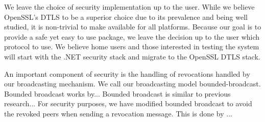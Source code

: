 \documentclass[conference]{IEEEtran}
\begin{document}


We leave the choice of security implementation up to the user.  While we believe
OpenSSL's DTLS to be a superior choice due to its prevalence and being well
studied, it is non-trivial to make available for all platforms.  Because our
goal is to provide a safe yet easy to use package, we leave the decision up to
the user which protocol to use.  We believe home users and those interested in
testing the system will start with the .NET security stack and migrate to the
OpenSSL DTLS stack.

An important component of security is the handling of revocations handled by our
broadcasting mechanism.  We call our broadcasting model bounded-broadcast.
Bounded broadcast works by...  Bounded broadcast is similar to previous research...
For security purposes, we have modified bounded broadcast to avoid the revoked
peers when sending a revocation message.  This is done by ...
\end{document}
